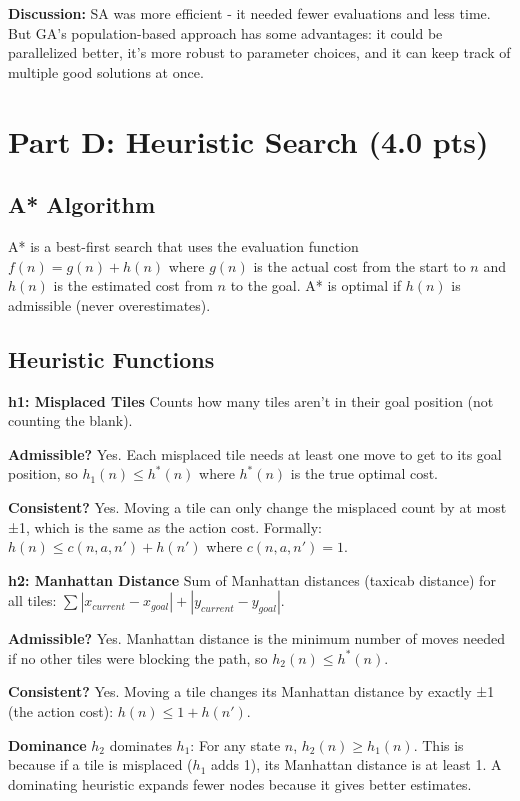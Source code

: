 \documentclass[letterpaper]{article}
\begin{document}
\textbf{Discussion:} SA was more efficient - it needed fewer evaluations and less time. But GA's population-based approach has some advantages: it could be parallelized better, it's more robust to parameter choices, and it can keep track of multiple good solutions at once.

\section{Part D: Heuristic Search (4.0 pts)}

\subsection{A* Algorithm}

A* is a best-first search that uses the evaluation function $f(n) = g(n) + h(n)$ where $g(n)$ is the actual cost from the start to $n$ and $h(n)$ is the estimated cost from $n$ to the goal. A* is optimal if $h(n)$ is admissible (never overestimates).

\subsection{Heuristic Functions}

\textbf{h1: Misplaced Tiles} Counts how many tiles aren't in their goal position (not counting the blank).

\textbf{Admissible?} Yes. Each misplaced tile needs at least one move to get to its goal position, so $h_1(n) \leq h^*(n)$ where $h^*(n)$ is the true optimal cost.

\textbf{Consistent?} Yes. Moving a tile can only change the misplaced count by at most ±1, which is the same as the action cost. Formally: $h(n) \leq c(n,a,n') + h(n')$ where $c(n,a,n') = 1$.

\textbf{h2: Manhattan Distance} Sum of Manhattan distances (taxicab distance) for all tiles: $\sum |x_{current} - x_{goal}| + |y_{current} - y_{goal}|$.

\textbf{Admissible?} Yes. Manhattan distance is the minimum number of moves needed if no other tiles were blocking the path, so $h_2(n) \leq h^*(n)$.

\textbf{Consistent?} Yes. Moving a tile changes its Manhattan distance by exactly ±1 (the action cost): $h(n) \leq 1 + h(n')$.

\textbf{Dominance} $h_2$ dominates $h_1$: For any state $n$, $h_2(n) \geq h_1(n)$. This is because if a tile is misplaced ($h_1$ adds 1), its Manhattan distance is at least 1. A dominating heuristic expands fewer nodes because it gives better estimates.
\end{document}
